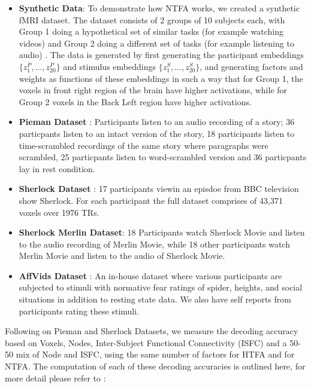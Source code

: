 \documentclass{article}
\begin{document}
\begin{itemize}
    
    \item \textbf{Synthetic Data}: To demonstrate how NTFA works, we created a synthetic fMRI dataset. The dataset consists of 2 groups of 10 subjects each, with Group 1 doing a hypothetical set of similar tasks (for example watching videos) and Group 2 doing a different set of tasks (for example listening to audio) . The data is generated by first generating the participant embeddings $\{z_1^P,...,z_{20}^P \}$ and stimulus embeddings $\{ z_1^S,...,z_{20}^S\}$, and generating factors and weights as functions of these embeddings in such a way that for Group 1, the voxels in front right region of the brain have higher activations, while for Group 2 voxels in the Back Left region have higher activations. 

    \item \textbf{Pieman Dataset} \cite{}: Participants listen to an audio recording of a story; 36 particpants listen to an intact version of the story, 18 participants listen to time-scrambled recordings of the same story where paragraphs were scrambled, 25 particpants listen to word-scrambled version and 36 particpants lay in rest condition.
    
    \item \textbf{Sherlock Dataset} \cite{}: 17 participants viewin an episdoe from BBC television show Sherlock. For each participant the full dataset comprises of 43,371 voxels over 1976 TRs.
    
    \item \textbf{Sherlock Merlin Dataset}: \cite{} 18 Participants watch Sherlock Movie and listen to the audio recording of Merlin Movie, while 18 other participants watch Merlin Movie and listen to the audio of Sherlock Movie. 
    
    \item \textbf{AffVids Dataset} \cite{}: An in-house dataset where various participants are subjected to stimuli with normative fear ratings of spider, heights, and social situations in addition to resting state data. We also have self reports from participants rating these stimuli. 
\end{itemize}

Following \cite{HTFA} on Pieman and Sherlock Datasets, we measure the decoding accuracy based on Voxels, Nodes, Inter-Subject Functional Connectivity (ISFC) \cite{HTFA32} and a 50-50 mix of Node and ISFC,   using the same number of factors for HTFA and for NTFA. The computation of each of these decoding accuracies is outlined here, for more detail please refer to \cite{HTFA}:
\end{document}
